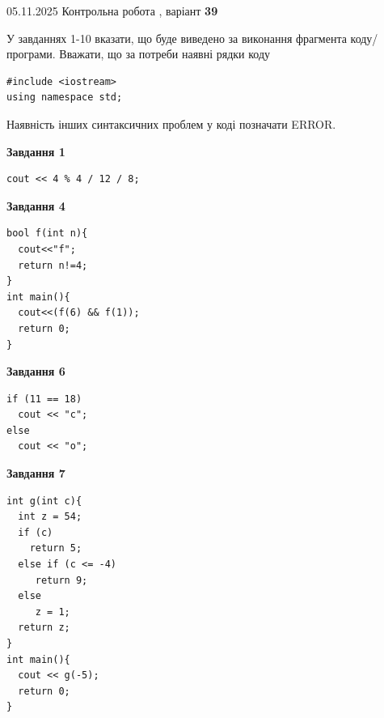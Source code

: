 \documentclass[12pt, ukrainian]{article}
\begin{document}
{\Large{05.11.2025 Контрольна робота , варіант  \No \textbf { 39 }\par}}
{
\begin {large}
У завданнях 1-10 вказати, що буде виведено за виконання фрагмента коду/про\-гра\-ми.
Вважати, що за потреби наявні рядки коду
\begin{verbatim}
#include <iostream>
using namespace std;
\end{verbatim}
Наявність інших синтаксичних проблем у коді позначати ERROR.

\begin{minipage}[t]{7.0cm}

\begin{center}
\textbf{Завдання 1}
\end{center}
\vspace{-8mm}

\begin{verbatim}
cout << 4 % 4 / 12 / 8;
\end{verbatim}



\begin{center}
\textbf{Завдання 4}
\end{center}
\vspace{-8mm}

\begin{verbatim}
bool f(int n){
  cout<<"f";
  return n!=4;
}
int main(){
  cout<<(f(6) && f(1));
  return 0;
}
\end{verbatim}



\begin{center}
\textbf{Завдання 6}
\end{center}
\vspace{-8mm}

\begin{verbatim}
if (11 == 18)
  cout << "c";
else
  cout << "o";
\end{verbatim}



\begin{center}
\textbf{Завдання 7}
\end{center}
\vspace{-8mm}

\begin{verbatim}
int g(int c){
  int z = 54;
  if (c)
    return 5;
  else if (c <= -4)
     return 9;
  else
     z = 1;
  return z;
}
int main(){
  cout << g(-5);
  return 0;
}
\end{verbatim}


\end{minipage}
\end{large}}
\end{document}
